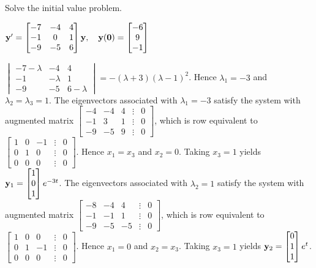 \documentclass{ximera}
\begin{document}
 \begin{problem}\label{exer:10.5.20}
 Solve the initial value problem.
 
 $ {\bf y}'
= \begin{bmatrix}-7&-4&4\\-1&0&1\\-9&-5&6\end{bmatrix}{\bf y},\quad\bf
{\bf y}(0)= \begin{bmatrix}-6\\9\\-1\end{bmatrix}$

\begin{solution}
    $ \begin{vmatrix}-7-\lambda&-4&4\\-1&-\lambda&1\\-9&-5&6-\lambda\end{vmatrix}
=-(\lambda+3)(\lambda-1)^2$.
Hence $\lambda_1=-3$ and  $\lambda_2=\lambda_3=1$.
The eigenvectors associated
 with $\lambda_1=-3$ satisfy the system with  augmented matrix
$  \begin{bmatrix}-4&-4&4&\vdots&0\\-1&3&1&
\vdots&0\\-9&-5&9&\vdots&0 \end{bmatrix}$,
which is row equivalent to
$  \begin{bmatrix}1&0&-1&\vdots&0\\0&1&0&
\vdots&0\\0&0&0&\vdots&0 \end{bmatrix}$.
Hence  $x_1=x_3$ and $x_2=0$.  Taking $x_3=1$
yields
${\bf y}_1=  \begin{bmatrix}1\\0\\1\end{bmatrix}e^{-3t}$.
The eigenvectors associated
 with $\lambda_2=1$ satisfy the system with  augmented matrix
$  \begin{bmatrix}-8&-4&4&\vdots&0\\-1&-1&1&
\vdots&0\\-9&-5&-5&\vdots&0 \end{bmatrix}$,
which is row equivalent to
$  \begin{bmatrix}1&0&0&\vdots&0\\0&1&-1&
\vdots&0\\0&0&0&\vdots&0 \end{bmatrix}$.
Hence  $x_1=0$ and $x_2=x_3$.  Taking $x_3=1$
yields
${\bf y}_2=  \begin{bmatrix}0\\1\\1\end{bmatrix}e^t$.

\end{solution}
\end{problem}
\end{document}
